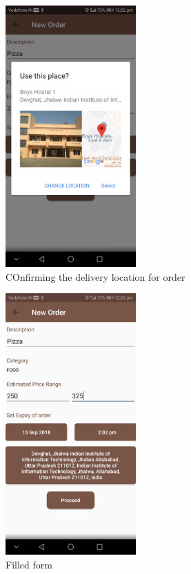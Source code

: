 \documentclass{report}
\begin{document}
\begin{figure}[h!]
\begin{subfigure}[h!]{.3\textwidth}
\centering
\includegraphics[width=5cm]{place.jpg}
\caption{\centering COnfirming the delivery location for order}
\end{subfigure}
\begin{subfigure}[h!]{.3\textwidth}
\centering
\includegraphics[width=5cm]{filled_form.jpg}
\caption{\centering Filled form}
\end{subfigure}
\begin{subfigure}[h!]{.3\textwidth}
\centering

\end{subfigure}
\end{figure}
\end{document}
